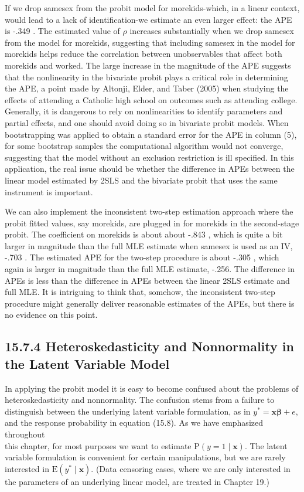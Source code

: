 \documentclass[10pt]{article}
\begin{document}
If we drop samesex from the probit model for morekids-which, in a linear context, would lead to a lack of identification-we estimate an even larger effect: the APE is -.349 . The estimated value of $\rho$ increases substantially when we drop samesex from the model for morekids, suggesting that including samesex in the model for morekids helps reduce the correlation between unobservables that affect both morekids and worked. The large increase in the magnitude of the APE suggests that the nonlinearity in the bivariate probit plays a critical role in determining the APE, a point made by Altonji, Elder, and Taber (2005) when studying the effects of attending a Catholic high school on outcomes such as attending college. Generally, it is dangerous to rely on nonlinearities to identify parameters and partial effects, and one should avoid doing so in bivariate probit models. When bootstrapping was applied to obtain a standard error for the APE in column (5), for some bootstrap samples the computational algorithm would not converge, suggesting that the model without an exclusion restriction is ill specified. In this application, the real issue should be whether the difference in APEs between the linear model estimated by 2SLS and the bivariate probit that uses the same instrument is important.

We can also implement the inconsistent two-step estimation approach where the probit fitted values, say morekids, are plugged in for morekids in the second-stage probit. The coefficient on morekids is about about -.843 , which is quite a bit larger in magnitude than the full MLE estimate when samesex is used as an IV, -.703 . The estimated APE for the two-step procedure is about -.305 , which again is larger in magnitude than the full MLE estimate, -.256. The difference in APEs is less than the difference in APEs between the linear 2SLS estimate and full MLE. It is intriguing to think that, somehow, the inconsistent two-step procedure might generally deliver reasonable estimates of the APEs, but there is no evidence on this point.

\subsection*{15.7.4 Heteroskedasticity and Nonnormality in the Latent Variable Model}
In applying the probit model it is easy to become confused about the problems of heteroskedasticity and nonnormality. The confusion stems from a failure to distinguish between the underlying latent variable formulation, as in $y^{*}=\mathbf{x} \boldsymbol{\beta}+e$, and the response probability in equation (15.8). As we have emphasized throughout\\
this chapter, for most purposes we want to estimate $\mathrm{P}(y=1 \mid \mathbf{x})$. The latent variable formulation is convenient for certain manipulations, but we are rarely interested in $\mathrm{E}\left(y^{*} \mid \mathbf{x}\right)$. (Data censoring cases, where we are only interested in the parameters of an underlying linear model, are treated in Chapter 19.)
\end{document}
